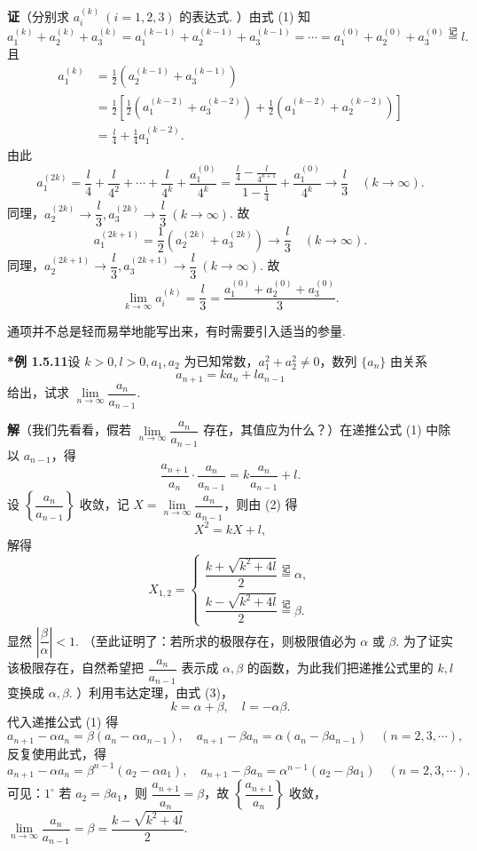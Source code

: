 \documentclass[UTF8, 12pt, fontset=fandol, oneside]{ctexart}
\begin{document}
\noindent\textbf{证}\quad （分别求 $a_i^{(k)}\ (i=1,2,3)$ 的表达式. ）由式 (1) 知
\[
  a_1^{(k)}+a_2^{(k)}+a_3^{(k)}
  =a_1^{(k-1)}+a_2^{(k-1)}+a_3^{(k-1)}
  =\cdots=a_1^{(0)}+a_2^{(0)}+a_3^{(0)}\stackrel{\text{记}}{=}l.
\]
且
\[
\begin{aligned}
  a_1^{(k)}
  &=\frac12(a_2^{(k-1)}+a_3^{(k-1)})\\
  &=\frac12\left[\frac12(a_1^{(k-2)}+a_3^{(k-2)})
    +\frac12(a_1^{(k-2)}+a_2^{(k-2)})\right]\\
  &=\frac{l}{4}+\frac14 a_1^{(k-2)}.
\end{aligned}
\]
由此
\[
  a_1^{(2k)}
  =\frac{l}{4}+\frac{l}{4^2}+\cdots+\frac{l}{4^k}
    +\frac{a_1^{(0)}}{4^k}
  =\frac{\frac{l}{4}-\frac{l}{4^{k+1}}}{1-\frac14}
    +\frac{a_1^{(0)}}{4^k}
  \to \frac{l}{3}\quad (k\to\infty).
\]
同理，$a_2^{(2k)}\to \dfrac{l}{3},a_3^{(2k)}\to \dfrac{l}{3}\ (k\to\infty)$. 故
\[
  a_1^{(2k+1)}=\frac12(a_2^{(2k)}+a_3^{(2k)})\to \frac{l}{3}\quad (k\to\infty).
\]
同理，$a_2^{(2k+1)}\to \dfrac{l}{3},a_3^{(2k+1)}\to \dfrac{l}{3}\ (k\to\infty)$. 故
\[
  \lim_{k\to\infty}a_i^{(k)}
  =\frac{l}{3}
  =\frac{a_1^{(0)}+a_2^{(0)}+a_3^{(0)}}{3}.
\]

通项并不总是轻而易举地能写出来，有时需要引入适当的参量.

\noindent\textbf{*例 1.5.11}\quad 设 $k>0,l>0,a_1,a_2$ 为已知常数，$a_1^2+a_2^2\ne 0$，数列 $\{a_n\}$ 由关系
\[
  a_{n+1}=ka_n+la_{n-1}
\tag{1}
\]
给出，试求 $\lim\limits_{n\to\infty}\dfrac{a_n}{a_{n-1}}$.

\noindent\textbf{解}\quad （我们先看看，假若 $\lim\limits_{n\to\infty}\dfrac{a_n}{a_{n-1}}$ 存在，其值应为什么？）在递推公式 (1) 中除以 $a_{n-1}$，得
\[
  \frac{a_{n+1}}{a_n}\cdot \frac{a_n}{a_{n-1}}
  =k\frac{a_n}{a_{n-1}}+l.
\tag{2}
\]
设 $\left\{\dfrac{a_n}{a_{n-1}}\right\}$ 收敛，记 $X=\lim\limits_{n\to\infty}\dfrac{a_n}{a_{n-1}}$，则由 (2) 得
\[
  X^2=kX+l,
\tag{3}
\]
解得
\[
  X_{1,2}=
  \begin{cases}
    \dfrac{k+\sqrt{k^2+4l}}{2}\stackrel{\text{记}}{=}\alpha,\\[6pt]
    \dfrac{k-\sqrt{k^2+4l}}{2}\stackrel{\text{记}}{=}\beta.
  \end{cases}
\]
显然 $\left|\dfrac{\beta}{\alpha}\right|<1$. （至此证明了：若所求的极限存在，则极限值必为 $\alpha$ 或 $\beta$. 为了证实该极限存在，自然希望把 $\dfrac{a_n}{a_{n-1}}$ 表示成 $\alpha,\beta$ 的函数，为此我们把递推公式里的 $k,l$ 变换成 $\alpha,\beta$. ）利用韦达定理，由式 (3)，
\[
  k=\alpha+\beta,\quad l=-\alpha\beta.
\]
代入递推公式 (1) 得
\[
  a_{n+1}-\alpha a_n=\beta(a_n-\alpha a_{n-1}),\quad
  a_{n+1}-\beta a_n=\alpha(a_n-\beta a_{n-1})\quad (n=2,3,\cdots),
\]
反复使用此式，得
\[
  a_{n+1}-\alpha a_n=\beta^{n-1}(a_2-\alpha a_1),\quad
  a_{n+1}-\beta a_n=\alpha^{n-1}(a_2-\beta a_1)\quad (n=2,3,\cdots).
\tag{4}
\]
可见：$1^\circ$ 若 $a_2=\beta a_1$，则 $\dfrac{a_{n+1}}{a_n}=\beta$，故 $\left\{\dfrac{a_{n+1}}{a_n}\right\}$ 收敛，$\lim\limits_{n\to\infty}\dfrac{a_n}{a_{n-1}}=\beta=\dfrac{k-\sqrt{k^2+4l}}{2}$.
\end{document}

